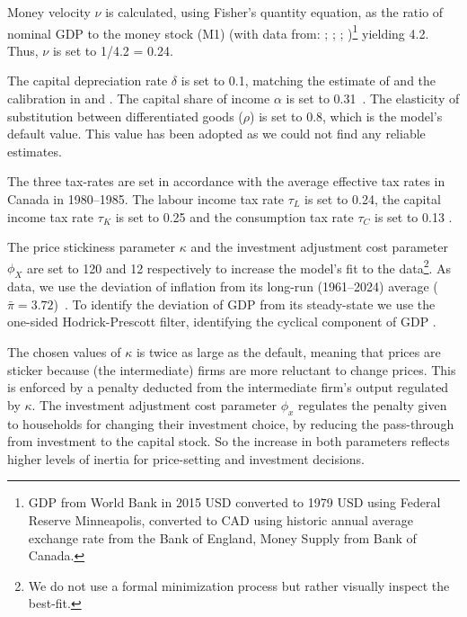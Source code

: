 \documentclass[12pt]{article}
\begin{document}
Money velocity $\nu$ is calculated, using Fisher's quantity equation, as the ratio of nominal GDP to the money stock (M1) (with data from: \textcite{bankofenglandCanadianDollarData2021}; 
\textcite{federalreservebankofminneapolisInflationCalculatorFederal}; \textcite{worldbankgroupWorldBankNational}; \textcite{bankofcanadaSelectedMonetaryAggregates})\footnote{GDP from World Bank in 2015 USD converted to 1979 USD using Federal Reserve Minneapolis, converted to CAD using historic annual average exchange rate from 
the Bank of England, Money Supply from Bank of Canada.} yielding 4.2. Thus, $\nu$ is set to 1/4.2 = 0.24. 

The capital depreciation rate $\delta$ is set to 0.1, matching the estimate of \textcite{statisticscanadaDepreciationRatesProductivity2007} and the calibration in \textcite{someOilDemandSupply2023} and \textcite{corriganToTEMIIIBank2021}.
The capital share of income $\alpha$ is set to 0.31~\parencite{fredst.louisShareLabourCompensation2021,feenstraNextGenerationPenn2015}. The elasticity of substitution between differentiated goods ($\rho$) is set to 0.8, which is the model's default value. This value has been adopted as we could not find any reliable estimates.

The three tax-rates are set in accordance with the average effective tax rates in Canada in 1980--1985. The labour income tax rate $\tau_L$ is set to 0.24, the capital income tax rate $\tau_K$ is set to 0.25 and the consumption tax rate $\tau_C$ is set to 0.13
\parencite{careyAverageEffectiveTax2000}. 

The price stickiness parameter $\kappa$ and the investment adjustment cost parameter $\phi_X$ are set to 120 and 12 respectively to increase the model's fit to the data\footnote{ We do not use a formal minimization process but rather visually inspect the best-fit.}. As data, we use the deviation of inflation from its long-run (1961--2024) average ($\bar{\pi} =  3.72$)~\parencite{worldbank_inflation_ca}. To identify the deviation of GDP from its steady-state we use the one-sided Hodrick-Prescott filter, identifying the cyclical component of GDP \parencite{fred_gdp_per_capita_ca}. 

The chosen values of $\kappa$ is twice as large as the default, meaning that prices are sticker because (the intermediate) firms are more reluctant to change prices. This is enforced by a penalty deducted from the intermediate firm's output regulated by $\kappa$. The investment adjustment cost parameter $\phi_x$ regulates the penalty given to households for changing their investment choice, by reducing the pass-through from investment to the capital stock. So the increase in both parameters reflects higher levels of inertia for price-setting and investment decisions.
\end{document}
